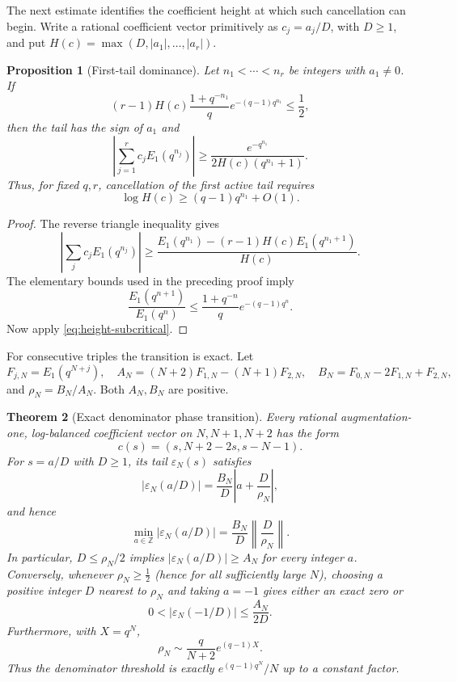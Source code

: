 \documentclass[11pt]{article}
\theoremstyle{keio}
\newtheorem{theorem}{Theorem}[section]
\newtheorem{proposition}[theorem]{Proposition}
\theoremstyle{definition}
\theoremstyle{remark}
\newcommand{\Z}{\mathbb Z}
\begin{document}
The next estimate identifies the coefficient height at which such
cancellation can begin.  Write a rational coefficient vector primitively as
\(c_j=a_j/D\), with \(D\ge1\), and put
\(H(c)=\max(D,|a_1|,\ldots,|a_r|)\).

\begin{proposition}[First-tail dominance]
\label{prop:first-tail-dominance}
Let \(n_1<\cdots<n_r\) be integers with \(a_1\ne0\).  If
\begin{equation}\label{eq:height-subcritical}
 (r-1)H(c)\frac{1+q^{-n_1}}q
 e^{-(q-1)q^{n_1}}\le\frac12,
\end{equation}
then the tail has the sign of \(a_1\) and
\begin{equation}\label{eq:first-tail-lower}
 \boxed{\displaystyle
 \left|\sum_{j=1}^rc_jE_1(q^{n_j})\right|
 \ge\frac{e^{-q^{n_1}}}{2H(c)(q^{n_1}+1)}.}
\end{equation}
Thus, for fixed \(q,r\), cancellation of the first active tail requires
\[
 \log H(c)\ge(q-1)q^{n_1}+O(1).
\]
\end{proposition}

\begin{proof}
The reverse triangle inequality gives
\[
 \left|\sum_jc_jE_1(q^{n_j})\right|
 \ge\frac{E_1(q^{n_1})-(r-1)H(c)E_1(q^{n_1+1})}{H(c)}.
\]
The elementary bounds used in the preceding proof imply
\[
 \frac{E_1(q^{n+1})}{E_1(q^n)}
 \le\frac{1+q^{-n}}q e^{-(q-1)q^n}.
\]
Now apply \eqref{eq:height-subcritical}.
\end{proof}

For consecutive triples the transition is exact.  Let
\[
 F_{j,N}=E_1(q^{N+j}),
 \quad
 A_N=(N+2)F_{1,N}-(N+1)F_{2,N},
 \quad
 B_N=F_{0,N}-2F_{1,N}+F_{2,N},
\]
and \(\rho_N=B_N/A_N\).  Both \(A_N,B_N\) are positive.

\begin{theorem}[Exact denominator phase transition]
\label{thm:denominator-transition}
Every rational augmentation-one, log-balanced coefficient vector on
\(N,N+1,N+2\) has the form
\[
 c(s)=(s,N+2-2s,s-N-1).
\]
For \(s=a/D\) with \(D\ge1\), its tail \(\varepsilon_N(s)\) satisfies
\begin{equation}\label{eq:denominator-exact}
 \boxed{\displaystyle
 |\varepsilon_N(a/D)|
 =\frac{B_N}{D}\left|a+\frac D{\rho_N}\right|,}
\end{equation}
and hence
\[
 \min_{a\in\Z}|\varepsilon_N(a/D)|
 =\frac{B_N}{D}\left\|\frac D{\rho_N}\right\|.
\]
In particular, \(D\le\rho_N/2\) implies
\(|\varepsilon_N(a/D)|\ge A_N\) for every integer \(a\).  Conversely,
whenever \(\rho_N\ge\tfrac12\) (hence for all sufficiently large \(N\)),
choosing a positive integer \(D\) nearest to \(\rho_N\) and taking
\(a=-1\) gives either an exact zero or
\begin{equation}\label{eq:denominator-upper}
 0<|\varepsilon_N(-1/D)|\le\frac{A_N}{2D}.
\end{equation}
Furthermore, with \(X=q^N\),
\begin{equation}\label{eq:rho-asymptotic}
 \rho_N\sim\frac q{N+2}e^{(q-1)X}.
\end{equation}
Thus the denominator threshold is exactly
\(e^{(q-1)q^N}/N\) up to a constant factor.
\end{theorem}
\end{document}
